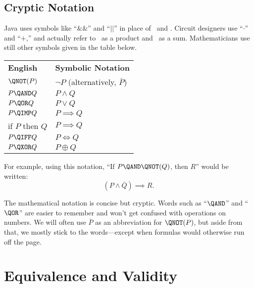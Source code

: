 \subsection{Cryptic Notation}
Java uses symbols like ``$\&\&$'' and ``$||$'' in place of \QAND\ and
\QOR.  Circuit designers use ``$\cdot$'' and ``$+$,'' and actually refer
to \QAND\ as a product and \QOR\ as a sum.  Mathematicians use still
other symbols given in the table below.
%
\begin{center}
\begin{tabular}{ll}
\textbf{English} & \textbf{Symbolic Notation} \\[1ex]
$\QNOT(P)$ & $\neg P$ \quad (alternatively, $\bar{P}$) \\
$P \QAND Q$ & $P \land Q$ \\
$P \QOR Q$ & $P \lor Q$ \\
$P \QIMP Q$ & $P \implies Q$ \\
if $P$ then $Q$ & $P \implies Q$ \\
$P \QIFF Q$ & $P \iff Q$\\
$P \QXOR Q$ & $P \oplus Q$
\end{tabular}
\end{center}
%
For example, using this notation, ``If $P \QAND \QNOT(Q)$, then $R$''
would be written:
%
\[
    (P \land \bar{Q}) \implies R.
\]

The mathematical notation is concise but cryptic.  Words such as
``$\QAND$'' and ``$\QOR$'' are easier to remember and won't get
confused with operations on numbers.  We will often use $\bar{P}$ as
an abbreviation for $\QNOT(P)$, but aside from that, we mostly stick
to the words---except when formulas would otherwise run off the page.

\begin{problems}
\classproblems
{}

\homeworkproblems
{}

\examproblems
{}
\end{problems}

\section{Equivalence and Validity}\label{equiv_valid_sec}


